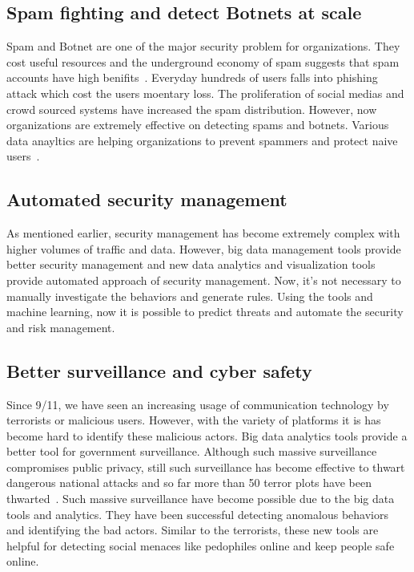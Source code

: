 \documentclass[sigconf]{acmart}
\begin{document}
\subsection{Spam fighting and detect Botnets at scale}
Spam and Botnet are one of the major security problem for organizations. They cost useful resources and the underground economy of spam suggests that spam accounts have high benifits~\cite{Stone-Gross:2011}. Everyday hundreds of users falls into phishing attack which cost the users moentary loss. The proliferation of social medias and crowd sourced systems have increased the spam distribution. However, now organizations are extremely effective on detecting spams and botnets. Various data anayltics are helping organizations  to prevent spammers and protect naive users~\cite{SINGH:2014}. 

\subsection{Automated security management}
As mentioned earlier, security management has become extremely complex with higher volumes of traffic and data. However, big data management tools provide better security management and new data analytics and visualization tools provide automated approach of security management. Now, it's not necessary to manually investigate the behaviors and generate rules. Using the tools and machine learning, now it is possible to predict threats and automate the security and risk management. 

\subsection{Better surveillance and cyber safety}
Since 9/11, we have seen an increasing usage of communication technology by terrorists or malicious users. However, with the variety of platforms it is has become hard to identify these malicious actors. Big data analytics tools provide a better tool for government surveillance. Although such massive surveillance compromises public privacy, still such surveillance has become effective to thwart dangerous national attacks and so far more than 50 terror plots have been thwarted~\cite{nsa}. Such massive surveillance have become possible due to the big data tools and analytics. They have been successful detecting anomalous behaviors and identifying the bad actors. Similar to the terrorists, these new tools are helpful for detecting social menaces like pedophiles online and keep people safe online. 
\end{document}
